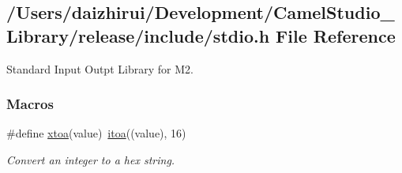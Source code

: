 \hypertarget{a00026}{}\subsection{/\+Users/daizhirui/\+Development/\+Camel\+Studio\+\_\+\+Library/release/include/stdio.h File Reference}
\label{a00026}


Standard Input Outpt Library for M2.  


\subsubsection*{Macros}
\begin{DoxyCompactItemize}
\item 
\#define \mbox{\hyperlink{a00026_a3b4b01e5fa94dded508adde4ca7e5ce5}{xtoa}}(value)~\mbox{\hyperlink{a00026_ac399b37e5355c704e130b1c6f60b71ec}{itoa}}((value), 16)
\begin{DoxyCompactList}\small\item\em Convert an integer to a hex string. \end{DoxyCompactList}\end{DoxyCompactItemize}
